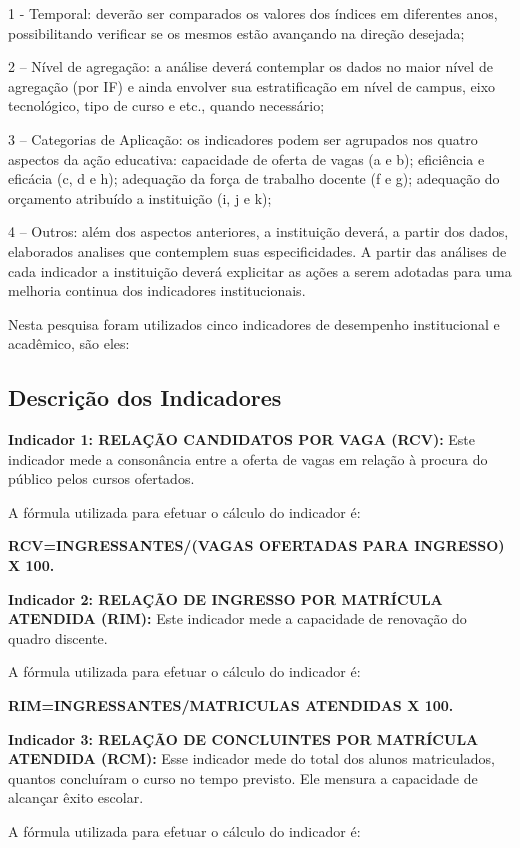 \documentclass[article,12pt,onesidea,4paper,english,brazil]{abntex2}
\begin{document}
	1 - Temporal: deverão ser comparados os valores dos índices em diferentes anos, possibilitando
	verificar se os mesmos estão avançando na direção desejada;
	
	2 – Nível de agregação: a análise deverá contemplar os dados no maior nível de agregação (por
	IF) e ainda envolver sua estratificação em nível de campus, eixo tecnológico, tipo de curso e etc.,
	quando necessário;
	
	3 – Categorias de Aplicação: os indicadores podem ser agrupados nos quatro aspectos da ação
	educativa: capacidade de oferta de vagas (a e b); eficiência e eficácia (c, d e h); adequação da
	força de trabalho docente (f e g); adequação do orçamento atribuído a instituição (i, j e k);
	
	4 – Outros: além dos aspectos anteriores, a instituição deverá, a partir dos dados, elaborados
	analises que contemplem suas especificidades. A partir das análises de cada indicador a
	instituição deverá explicitar as ações a serem adotadas para uma melhoria continua dos
	indicadores institucionais.
	
	Nesta pesquisa foram utilizados cinco indicadores de desempenho institucional e acadêmico,
	são eles:
	
	\subsection*{Descrição dos Indicadores}
	\textbf{Indicador 1: RELAÇÃO CANDIDATOS POR VAGA (RCV):} Este indicador mede a
	consonância entre a oferta de vagas em relação à procura do público pelos cursos ofertados.
	
	A fórmula utilizada para efetuar o cálculo do indicador é:
	
	\textbf{RCV=INGRESSANTES/(VAGAS OFERTADAS PARA INGRESSO) X 100.}
	
	\textbf{Indicador 2: RELAÇÃO DE INGRESSO POR MATRÍCULA ATENDIDA (RIM):} Este
	indicador mede a capacidade de renovação do quadro discente.
	
	A fórmula utilizada para efetuar o cálculo do indicador é:
	
    \textbf{	RIM=INGRESSANTES/MATRICULAS ATENDIDAS X 100.}
	
	\textbf{Indicador 3: RELAÇÃO DE CONCLUINTES POR MATRÍCULA ATENDIDA (RCM):}
	Esse indicador mede do total dos alunos matriculados, quantos concluíram o curso no tempo
	previsto. Ele mensura a capacidade de alcançar êxito escolar.
	
	A fórmula utilizada para efetuar o cálculo do indicador é:
	
\end{document}
